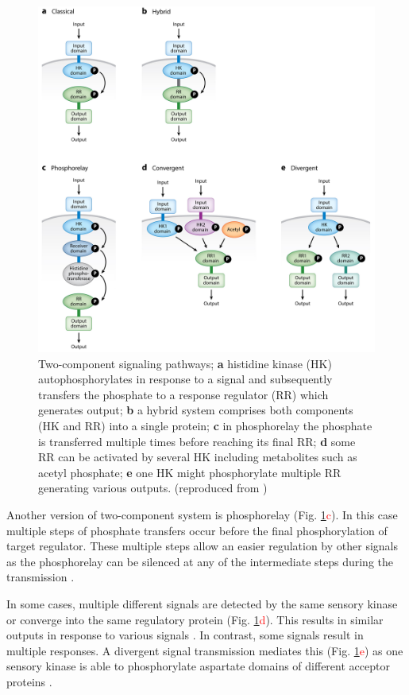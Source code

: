 \begin{figure}[h!]
  \centering
  \includegraphics[scale=0.85]{text/Pictures/TwoComponent.jpeg}
	\caption{Two-component signaling pathways; \textbf{a} histidine kinase (HK) autophosphorylates in response to a signal and subsequently transfers the phosphate to a response regulator (RR) which generates output; \textbf{b} a hybrid system comprises both components (HK and RR) into a single protein; \textbf{c} in phosphorelay the phosphate is transferred multiple times before reaching its final RR; \textbf{d} some RR can be activated by several HK including metabolites such as acetyl phosphate; \textbf{e} one HK might phosphorylate multiple RR generating various outputs. (reproduced from \cite{groisman2016feedback})}
	\label{two}
\end{figure}

Another version of two-component system is phosphorelay (Fig. \ref{two}\textcolor{red}{c}).
In this case multiple steps of phosphate transfers occur before the final phosphorylation of target regulator.
These multiple steps allow an easier regulation by other signals as the phosphorelay can be silenced at any of the intermediate steps during the transmission \cite{perego2001pentapeptide, groisman2016feedback}.

In some cases, multiple different signals are detected by the same sensory kinase or converge into the same regulatory protein (Fig. \ref{two}\textcolor{red}{d}).
This results in similar outputs in response to various signals \cite{kaczmarczyk2014complex, chambonnier2016hybrid}.
In contrast, some signals result in multiple responses.
A divergent signal transmission mediates this (Fig. \ref{two}\textcolor{red}{e}) as one sensory kinase is able to phosphorylate aspartate domains of different acceptor proteins \cite{mika2005two, groisman2016feedback}.

